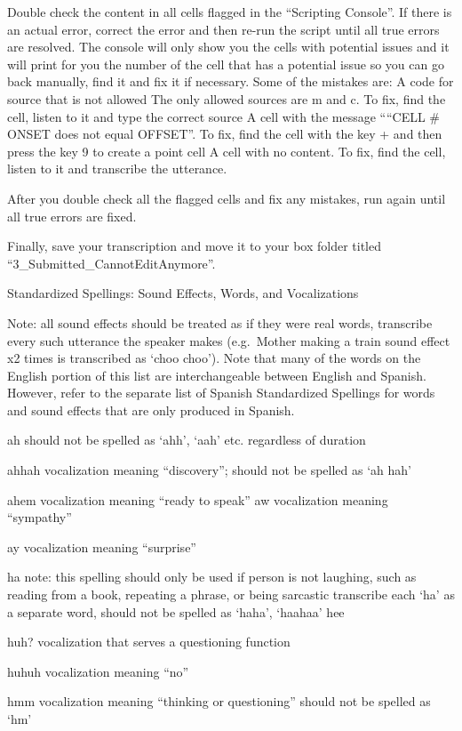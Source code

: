\documentclass[
  12pt,
]{book}
\begin{document}
Double check the content in all cells flagged in the ``Scripting Console''. If there is an actual error, correct the error and then re-run the script until all true errors are resolved. The console will only show you the cells with potential issues and it will print for you the number of the cell that has a potential issue so you can go back manually, find it and fix it if necessary. Some of the mistakes are:
A code for source that is not allowed
The only allowed sources are m and c.
To fix, find the cell, listen to it and type the correct source
A cell with the message ````CELL \# ONSET does not equal OFFSET''. To fix, find the cell with the key + and then press the key 9 to create a point cell
A cell with no content. To fix, find the cell, listen to it and transcribe the utterance.

After you double check all the flagged cells and fix any mistakes, run again until all true errors are fixed.

Finally, save your transcription and move it to your box folder titled ``3\_Submitted\_CannotEditAnymore''.

Standardized Spellings: Sound Effects, Words, and Vocalizations

Note: all sound effects should be treated as if they were real words, transcribe every such utterance the speaker makes (e.g.~Mother making a train sound effect x2 times is transcribed as `choo choo'). Note that many of the words on the English portion of this list are interchangeable between English and Spanish. However, refer to the separate list of Spanish Standardized Spellings for words and sound effects that are only produced in Spanish.

ah
should not be spelled as `ahh', `aah' etc. regardless of duration

ahhah
vocalization meaning ``discovery''; should not be spelled as `ah hah'

ahem
vocalization meaning ``ready to speak''
aw
vocalization meaning ``sympathy''

ay
vocalization meaning ``surprise''

ha
note: this spelling should only be used if person is not laughing, such as reading from a book, repeating a phrase, or being sarcastic
transcribe each `ha' as a separate word, should not be spelled as `haha', `haahaa'
hee

huh?
vocalization that serves a questioning function

huhuh
vocalization meaning ``no''

hmm
vocalization meaning ``thinking or questioning''
should not be spelled as `hm'
\end{document}
